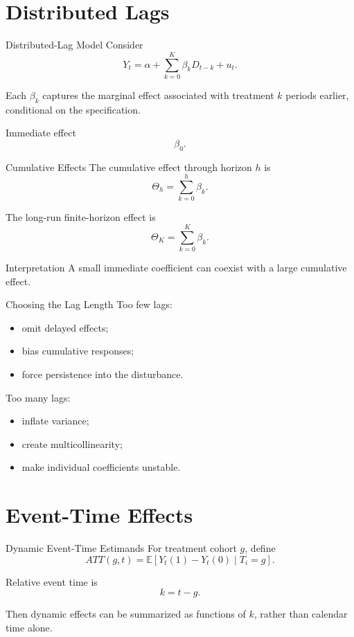 \documentclass[aspectratio=169,11pt]{beamer}
\newcommand{\E}{\mathbb{E}}
\begin{document}
\section{Distributed Lags}

\begin{frame}{Distributed-Lag Model}
Consider
\[
Y_t
=
\alpha
+
\sum_{k=0}^{K}\beta_k D_{t-k}
+
u_t.
\]

Each \(\beta_k\) captures the marginal effect associated with treatment \(k\) periods earlier, conditional on the specification.

\begin{block}{Immediate effect}
\[
\beta_0.
\]
\end{block}
\end{frame}

\begin{frame}{Cumulative Effects}
The cumulative effect through horizon \(h\) is
\[
\Theta_h
=
\sum_{k=0}^{h}\beta_k.
\]

The long-run finite-horizon effect is
\[
\Theta_K
=
\sum_{k=0}^{K}\beta_k.
\]

\begin{alertblock}{Interpretation}
A small immediate coefficient can coexist with a large cumulative effect.
\end{alertblock}
\end{frame}

\begin{frame}{Choosing the Lag Length}
Too few lags:
\begin{itemize}
\item omit delayed effects;
\item bias cumulative responses;
\item force persistence into the disturbance.
\end{itemize}

Too many lags:
\begin{itemize}
\item inflate variance;
\item create multicollinearity;
\item make individual coefficients unstable.
\end{itemize}
\end{frame}

\section{Event-Time Effects}

\begin{frame}{Dynamic Event-Time Estimands}
For treatment cohort \(g\), define
\[
ATT(g,t)
=
\E[Y_t(1)-Y_t(0)\mid T_i=g].
\]

Relative event time is
\[
k=t-g.
\]

Then dynamic effects can be summarized as functions of \(k\), rather than calendar time alone.
\end{frame}
\end{document}
